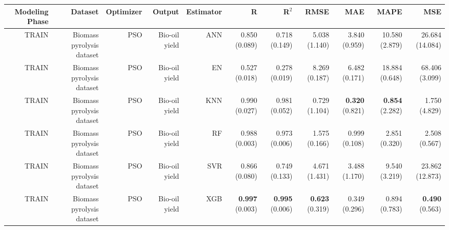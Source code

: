 \begin{table}
\centering
\label{eml___comparison_datasets_table_pso_biomass_pyrolysis_dataset_train.tex}
\begin{tabular}{rrrrrrrrrrr}
\toprule
Modeling Phase &                   Dataset & Optimizer &        Output & Estimator &                    R &                R$^2$ &                 RMSE &                  MAE &                 MAPE &                  MSE \\
\midrule
         TRAIN & Biomass pyrolysis dataset &       PSO & Bio-oil yield &       ANN &        0.850 (0.089) &        0.718 (0.149) &        5.038 (1.140) &        3.840 (0.959) &       10.580 (2.879) &      26.684 (14.084) \\
         TRAIN & Biomass pyrolysis dataset &       PSO & Bio-oil yield &        EN &        0.527 (0.018) &        0.278 (0.019) &        8.269 (0.187) &        6.482 (0.171) &       18.884 (0.648) &       68.406 (3.099) \\
         TRAIN & Biomass pyrolysis dataset &       PSO & Bio-oil yield &       KNN &        0.990 (0.027) &        0.981 (0.052) &        0.729 (1.104) & { \bf 0.320} (0.821) & { \bf 0.854} (2.282) &        1.750 (4.829) \\
         TRAIN & Biomass pyrolysis dataset &       PSO & Bio-oil yield &        RF &        0.988 (0.003) &        0.973 (0.006) &        1.575 (0.166) &        0.999 (0.108) &        2.851 (0.320) &        2.508 (0.567) \\
         TRAIN & Biomass pyrolysis dataset &       PSO & Bio-oil yield &       SVR &        0.866 (0.080) &        0.749 (0.133) &        4.671 (1.431) &        3.488 (1.170) &        9.540 (3.219) &      23.862 (12.873) \\
         TRAIN & Biomass pyrolysis dataset &       PSO & Bio-oil yield &       XGB & { \bf 0.997} (0.003) & { \bf 0.995} (0.006) & { \bf 0.623} (0.319) &        0.349 (0.296) &        0.894 (0.783) & { \bf 0.490} (0.563) \\
\bottomrule
\end{tabular}
\end{table}
